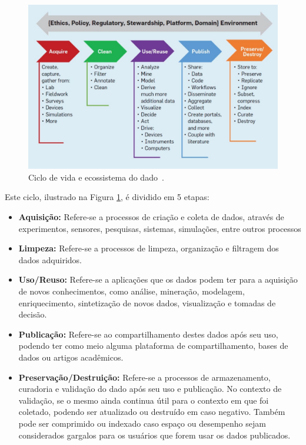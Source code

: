 \documentclass[portugues]{ic-tese}
\begin{document}
\begin{figure}[h]
\centering
\includegraphics[scale=0.6]{images/data_life_cycle.jpg}
\caption {Ciclo de vida e ecossistema do dado~\citep{Berman_2018}.}
\label{fig:cicloDado}
\end{figure}

Este ciclo, ilustrado na Figura \ref{fig:cicloDado}, é dividido em 5 etapas:

\begin{itemize}
\item \textbf{Aquisição:} Refere-se a processos de criação e coleta de dados, através de experimentos, sensores, pesquisas, sistemas, simulações, entre outros processos
\item \textbf{Limpeza:} Refere-se a processos de limpeza, organização e filtragem dos dados adquiridos.
\item \textbf{Uso/Reuso:} Refere-se a aplicações que os dados podem ter para a aquisição de novos conhecimentos, como análise, mineração, modelagem, enriquecimento, sintetização de novos dados, visualização e tomadas de decisão.
\item \textbf{Publicação:} Refere-se ao compartilhamento destes dados após seu uso, podendo ter como meio alguma plataforma de compartilhamento, bases de dados ou artigos acadêmicos.
\item \textbf{Preservação/Destruição:} Refere-se a processos de armazenamento, curadoria e validação do dado após seu uso e publicação. No contexto de validação, se o mesmo ainda continua útil para o contexto em que foi coletado, podendo ser atualizado ou destruído em caso negativo. Também pode ser comprimido ou indexado caso espaço ou desempenho sejam considerados gargalos para os usuários que forem usar os dados publicados.
\end{itemize}
\end{document}
